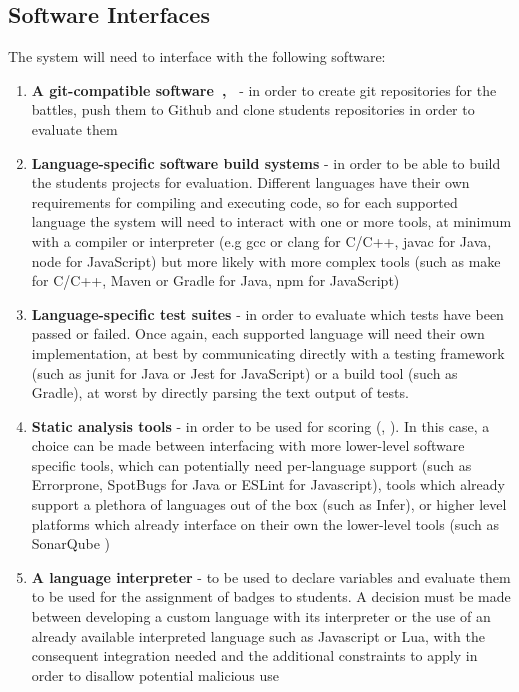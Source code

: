 \subsection{Software Interfaces}
The system will need to interface with the following software:
\begin{enumerate}
      \item \textbf{A git-compatible software~\cite{EmbeddingGit},~\cite{JGit}} {-} in order to create git repositories for
            the battles, push them to Github and clone students repositories in order to evaluate
            them
      \item \textbf{Language-specific software build systems} {-} in order to be able to build
            the students projects for evaluation. Different languages have their own
            requirements for compiling and executing code, so for each supported language
            the system will need to interact with one or more tools, at minimum with a
            compiler or interpreter (e.g gcc or clang for C/C++, javac for Java, node for
            JavaScript) but more likely with more complex tools (such as make for C/C++,
            Maven or Gradle for Java, npm for JavaScript)
      \item \textbf{Language-specific test suites} {-} in order to evaluate which
            tests have been passed or failed. Once again, each supported language
            will need their own implementation, at best by communicating directly
            with a testing framework (such as junit for Java or Jest for JavaScript)
            or a build tool (such as Gradle), at worst by directly parsing the text
            output of tests.
      \item \textbf{Static analysis tools} {-} in order to be used for scoring
            (\cite{WikipediaStaticAnalysis}, \cite{GhStaticAnalysis}). In this
            case, a choice can be made between interfacing with more lower-level software
            specific tools, which can potentially need per-language support (such as
            Errorprone, SpotBugs for Java or ESLint for Javascript), tools which already
            support a plethora of languages out of the box (such as Infer), or higher level
            platforms which already interface on their own the lower-level tools (such as
            SonarQube \cite{SonarQube})
      \item \textbf{A language interpreter} {-} to be used to declare variables and evaluate
            them to be used for the assignment of badges to students. A decision must be made
            between developing a custom language with its interpreter or the use of an already
            available interpreted language such as Javascript or Lua, with the consequent
            integration needed and the additional constraints to apply in order to disallow
            potential malicious use
\end{enumerate}
